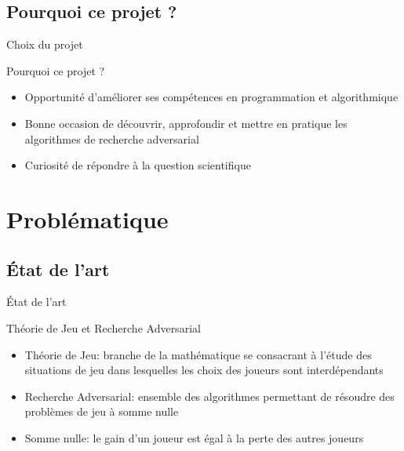 \documentclass{beamer}
\begin{document}
    \subsection*{Pourquoi ce projet ?}
    \begin{frame}{Choix du projet}
        \begin{block}{Pourquoi ce projet ?}
            \pause
            \begin{itemize}
                [<+->]
                \item Opportunité d'améliorer ses compétences en programmation et algorithmique
                \item Bonne occasion de découvrir, approfondir et mettre en pratique les algorithmes de recherche adversarial
                \item Curiosité de répondre à la question scientifique
            \end{itemize}
        \end{block}
    \end{frame}


    \section{Problématique}
    \subsection*{État de l'art}
    \begin{frame}{État de l'art}
        \begin{block}{Théorie de Jeu et Recherche Adversarial}
            \pause
            \begin{itemize}
                [<+->]
                \item \alert{Théorie de Jeu}: branche de la mathématique se consacrant à l'étude des situations de jeu dans lesquelles les choix des joueurs sont interdépendants
                \item \alert{Recherche Adversarial}: ensemble des algorithmes permettant de résoudre des problèmes de jeu à somme nulle
                \item \alert{Somme nulle}: le gain d'un joueur est égal à la perte des autres joueurs
            \end{itemize}
        \end{block}
    \end{frame}
\end{document}
